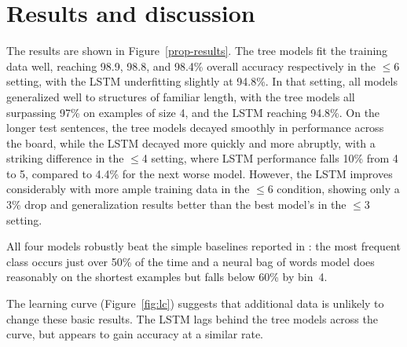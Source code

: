
\section{Results and discussion}\label{sec:discussion}

The results are shown in Figure~\ref{prop-results}. 
The tree models fit the training data well, reaching 98.9, 98.8, and 98.4\% overall accuracy respectively in the $\le$6 setting, with the LSTM underfitting slightly at 94.8\%. 
In that setting, all models generalized well to structures of familiar length, with the tree models all surpassing 97\% on examples of size 4, and the LSTM reaching 94.8\%.
On the longer test sentences, the tree models decayed smoothly in performance across the board, while the LSTM decayed more quickly and more abruptly, with a striking difference in the $\le$4 setting, where LSTM performance falls 10\% from 4 to 5, compared to 4.4\% for the next worse model. However, the LSTM improves considerably with more ample training data in the $\le$6 condition, showing only a 3\% drop and generalization results better than the best model's in the $\le$3 setting.

All four models robustly beat the simple baselines reported in : the most frequent class occurs just over 50\% of the time and a neural bag of words model does reasonably on the shortest examples but falls below 60\% by bin~4.

The learning curve (Figure~\ref{fig:lc}) suggests that additional data is unlikely to change these basic results. The LSTM lags behind the tree models across the curve, but appears to gain accuracy at a similar rate.


